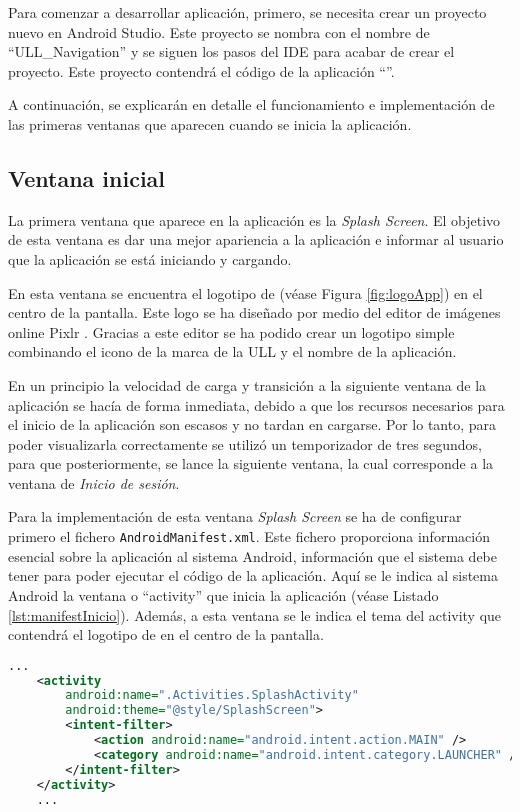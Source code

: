 Para comenzar a desarrollar aplicación, primero, se necesita crear un proyecto nuevo en Android Studio. Este proyecto se nombra con el nombre de ``ULL\_Navigation'' y se siguen los pasos del IDE para acabar de crear el proyecto. Este proyecto contendrá el código de la aplicación ``\ULLAR{}''.  

A continuación, se explicarán en detalle el funcionamiento e implementación de las primeras ventanas que aparecen cuando se inicia la aplicación. 

\subsection{Ventana inicial}

La primera ventana que aparece en la aplicación es la \textit{Splash Screen}. El objetivo de esta ventana es dar una mejor apariencia a la aplicación e informar al usuario que la aplicación se está iniciando y cargando. 

En esta ventana se encuentra el logotipo de \ULLAR{} (véase Figura \ref{fig:logoApp}) en el centro de la pantalla. Este logo se ha diseñado por medio del editor de imágenes online Pixlr \cite{URL::pixlr}. Gracias a este editor se ha podido crear un logotipo simple combinando el icono de la marca de la ULL y el nombre de la aplicación.
    

En un principio la velocidad de carga y transición a la siguiente ventana de la aplicación se hacía de forma inmediata, debido a que los recursos necesarios para el inicio de la aplicación son escasos y no tardan en cargarse. Por lo tanto, para poder visualizarla correctamente se utilizó un temporizador de tres segundos, para que posteriormente, se lance la siguiente ventana, la cual corresponde a la ventana de \textit{Inicio de sesión}.

Para la implementación de esta ventana \textit{Splash Screen} se ha de configurar primero el fichero \texttt{AndroidManifest.xml}. Este fichero proporciona información esencial sobre la aplicación al sistema Android, información que el sistema debe tener para poder ejecutar el código de la aplicación. Aquí se le indica al sistema Android la ventana o ``activity'' \cite{URL::activity} que inicia la aplicación (véase Listado \ref{lst:manifestInicio}). Además, a esta ventana se le indica el tema del activity que contendrá el logotipo de \ULLAR{} en el centro de la pantalla.

\begin{lstlisting}[language=XML,caption={Fichero \texttt{AndroidManifest.xml}, activity que inicia la aplicación.}, label={lst:manifestInicio}]
    ...
    <activity
        android:name=".Activities.SplashActivity"
        android:theme="@style/SplashScreen">
        <intent-filter> 
            <action android:name="android.intent.action.MAIN" />
            <category android:name="android.intent.category.LAUNCHER" />
        </intent-filter>
    </activity>
    ...
\end{lstlisting}

